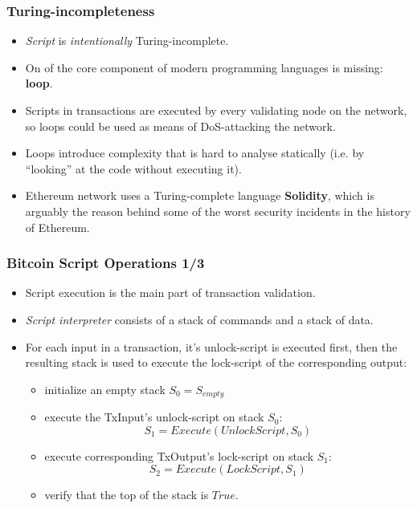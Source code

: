 \documentclass{beamer}
\begin{document}
\begin{frame}[fragile]
  \frametitle{Turing-incompleteness}
  \begin{itemize}
  \item \textit{Script} is \textit{intentionally} Turing-incomplete.
  \item On of the core component of modern programming languages is missing:
    \textbf{loop}.
  \item Scripts in transactions are executed by every validating node on the
    network, so loops could be used as means of DoS-attacking the network.
  \item Loops introduce complexity that is hard to analyse statically (i.e. by
    ``looking'' at the code without executing it).
  \item Ethereum network uses a Turing-complete language \textbf{Solidity},
    which is arguably the reason behind some of the worst security incidents in
    the history of Ethereum.
  \end{itemize}
\end{frame}

\begin{frame}[fragile]
  \frametitle{Bitcoin Script Operations 1/3}
  \begin{itemize}
  \item Script execution is the main part of transaction validation.
  \item \textit{Script interpreter} consists of a stack of commands and a stack
    of data.
  \item For each input in a transaction, it's unlock-script is executed first,
    then the resulting stack is used to execute the lock-script of the
    corresponding output:
    \begin{itemize}
    \item initialize an empty stack $S_0 = S_{empty}$
    \item execute the TxInput's unlock-script on stack $S_0$:
      $$S_1 = Execute(UnlockScript, S_0)$$
    \item execute corresponding TxOutput's lock-script on stack $S_1$:
      $$S_2 = Execute(LockScript, S_1)$$
    \item verify that the top of the stack is $True$.
    \end{itemize}
  \end{itemize}
\end{frame}
\end{document}
